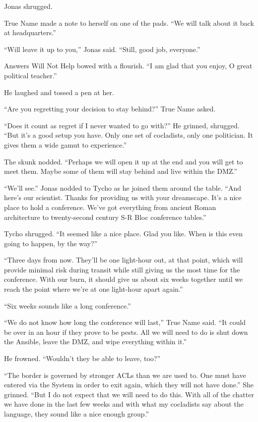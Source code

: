 Jonas shrugged.

True Name made a note to herself on one of the pads. ``We will talk about it back at headquarters.''

``Will leave it up to you,'' Jonas said. ``Still, good job, everyone.''

Answers Will Not Help bowed with a flourish. ``I am glad that you enjoy, O great political teacher.''

He laughed and tossed a pen at her.

``Are you regretting your decision to stay behind?'' True Name asked.

``Does it count as regret if I never wanted to go with?'' He grinned, shrugged. ``But it's a good setup you have. Only one set of cocladists, only one politician. It gives them a wide gamut to experience.''

The skunk nodded. ``Perhaps we will open it up at the end and you will get to meet them. Maybe some of them will stay behind and live within the DMZ.''

``We'll see.'' Jonas nodded to Tycho as he joined them around the table. ``And here's our scientist. Thanks for providing us with your dreamscape. It's a nice place to hold a conference. We've got everything from ancient Roman architecture to twenty-second century S-R Bloc conference tables.''

Tycho shrugged. ``It seemed like a nice place. Glad you like. When is this even going to happen, by the way?''

``Three days from now. They'll be one light-hour out, at that point, which will provide minimal risk during transit while still giving us the most time for the conference. With our burn, it should give us about six weeks together until we reach the point where we're at one light-hour apart again.''

``Six weeks sounds like a long conference.''

``We do not know how long the conference will last,'' True Name said. ``It could be over in an hour if they prove to be pests. All we will need to do is shut down the Ansible, leave the DMZ, and wipe everything within it.''

He frowned. ``Wouldn't they be able to leave, too?''

``The border is governed by stronger ACLs than we are used to. One must have entered via the System in order to exit again, which they will not have done.'' She grinned. ``But I do not expect that we will need to do this. With all of the chatter we have done in the last few weeks and with what my cocladists say about the language, they sound like a nice enough group.''

